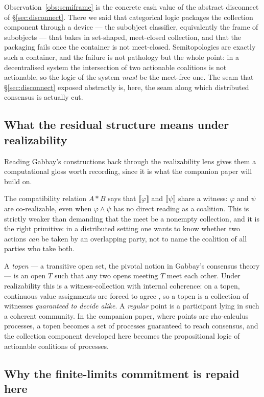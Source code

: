 \documentclass[11pt]{article}
\theoremstyle{definition}
\theoremstyle{plain}
\newcommand{\sem}[1]{\llbracket #1 \rrbracket}
\begin{document}
Observation~\ref{obs:semiframe} is the concrete cash value of the abstract
disconnect of \S\ref{sec:disconnect}. There we said that categorical logic
packages the collection component through a device --- the subobject classifier,
equivalently the frame of subobjects --- that bakes in set-shaped, meet-closed
collection, and that the packaging fails once the container is not meet-closed.
Semitopologies are exactly such a container, and the failure is not pathology
but the whole point: in a decentralised system the intersection of two
actionable coalitions is not actionable, so the logic of the system \emph{must}
be the meet-free one. The seam that \S\ref{sec:disconnect} exposed abstractly
is, here, the seam along which distributed consensus is actually cut.

\subsection{What the residual structure means under realizability}

Reading Gabbay's constructions back through the realizability lens gives them a
computational gloss worth recording, since it is what the companion paper will
build on.

The compatibility relation $A * B$ says that $\sem{\varphi}$ and $\sem{\psi}$
share a witness: $\varphi$ and $\psi$ are co-realizable, even when
$\varphi\wedge\psi$ has no direct reading as a coalition. This is strictly
weaker than demanding that the meet be a nonempty collection, and it is the
right primitive: in a distributed setting one wants to know whether two actions
\emph{can} be taken by an overlapping party, not to name the coalition of all
parties who take both.

A \emph{topen} --- a transitive open set, the pivotal notion in Gabbay's
consensus theory --- is an open $T$ such that any two opens meeting $T$ meet
each other. Under realizability this is a witness-collection with internal
coherence: on a topen, continuous value assignments are forced to agree
\cite{Gabbay25}, so a topen is a collection of witnesses \emph{guaranteed to
decide alike}. A \emph{regular} point is a participant lying in such a coherent
community. In the companion paper, where points are rho-calculus processes, a
topen becomes a set of processes guaranteed to reach consensus, and the
collection component developed here becomes the propositional logic of
actionable coalitions of processes.

\subsection{Why the finite-limits commitment is repaid here}
\end{document}
